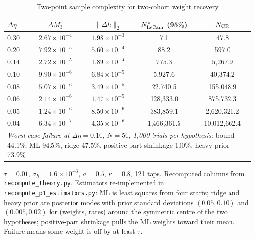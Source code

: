 \begin{table}[t]\centering\small
\begin{threeparttable}
\caption{Two-point sample complexity for two-cohort weight recovery}\label{tab:lecam}
\begin{tabular}{lcccc}
\toprule
$\Delta\eta$ & $\Delta M_3$ & $\|\Delta h\|_2$ & $N^*_{\rm LeCam}$ (95\%) & $N_{\rm CR}$\\
\midrule
0.30 & $2.67\times10^{-4}$ & $1.98\times10^{-3}$ & 7.1 & 47.8\\
0.20 & $7.92\times10^{-5}$ & $5.60\times10^{-4}$ & 88.2 & 597.0\\
0.14 & $2.72\times10^{-5}$ & $1.89\times10^{-4}$ & 775.3 & 5{,}267.9\\
0.10 & $9.90\times10^{-6}$ & $6.84\times10^{-5}$ & 5{,}927.6 & 40{,}374.2\\
0.08 & $5.07\times10^{-6}$ & $3.49\times10^{-5}$ & 22{,}740.5 & 155{,}048.9\\
0.06 & $2.14\times10^{-6}$ & $1.47\times10^{-5}$ & 128{,}333.0 & 875{,}732.3\\
0.05 & $1.24\times10^{-6}$ & $8.50\times10^{-6}$ & 383{,}859.1 & 2{,}620{,}321.2\\
0.04 & $6.34\times10^{-7}$ & $4.35\times10^{-6}$ & 1{,}466{,}361.5 & 10{,}012{,}662.4\\
\midrule
\multicolumn{5}{p{0.85\textwidth}}{\emph{Worst-case failure at $\Delta\eta=0.10$, $N=50$, 1,000 trials per hypothesis}: bound 44.1\%; ML 94.5\%, ridge 47.5\%, positive-part shrinkage 100\%, heavy prior 73.9\%.}\\
\bottomrule
\end{tabular}
\begin{tablenotes}\footnotesize\item $\tau=0.01$, $\sigma_h=1.6\times10^{-3}$, $a=0.5$, $\kappa=0.8$, 121 taps. Recomputed columns from \texttt{recompute\_theory.py}. Estimators re-implemented in \texttt{recompute\_p1\_estimators.py}: ML is least squares from four starts; ridge and heavy prior are posterior modes with prior standard deviations $(0.05,0.10)$ and $(0.005,0.02)$ for (weights, rates) around the symmetric centre of the two hypotheses; positive-part shrinkage pulls the ML weights toward their mean. Failure means some weight is off by at least $\tau$.\end{tablenotes}
\end{threeparttable}
\end{table}

